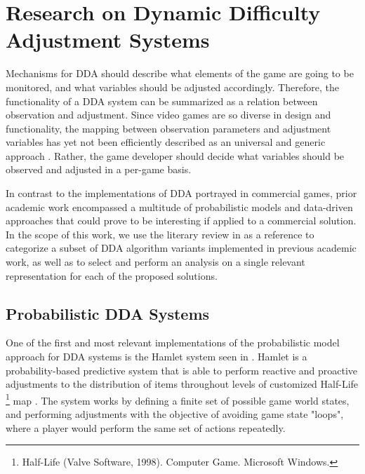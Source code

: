 \documentclass[cic,tc,english]{iiufrgs}
\begin{document}
\section{Research on Dynamic Difficulty Adjustment Systems}

Mechanisms for DDA should describe what elements of the game are going to be monitored, and what variables should be adjusted accordingly. Therefore, the functionality of a DDA system can be summarized as a relation between observation and adjustment. Since video games are so diverse in design and functionality, the mapping between observation parameters and adjustment variables has yet not been efficiently described as an universal and generic approach \cite{PHD_DynamicDifficultyAdjustment}. Rather, the game developer should decide what variables should be observed and adjusted in a per-game basis.

In contrast to the implementations of DDA portrayed in commercial games, prior academic work encompassed a multitude of probabilistic models and data-driven approaches that could prove to be interesting if applied to a commercial solution. In the scope of this work, we use the literary review in \cite{article_ddareview} as a reference to categorize a subset of DDA algorithm variants implemented in previous academic work, as well as to select and perform an analysis on a single relevant representation for each of the proposed solutions.

\subsection{Probabilistic DDA Systems}

One of the first and most relevant implementations of the probabilistic model approach for DDA systems is the Hamlet system seen in \cite{article_casefordynamicdifficulty}. Hamlet is a probability-based predictive system that is able to perform reactive and proactive adjustments to the distribution of items throughout levels of customized Half-Life \footnote{Half-Life (Valve Software, 1998). Computer Game. Microsoft Windows.} map \cite{article_casefordynamicdifficulty}. The system works by defining a finite set of possible game world states, and performing adjustments with the objective of avoiding game state "loops", where a player would perform the same set of actions repeatedly.
\end{document}
